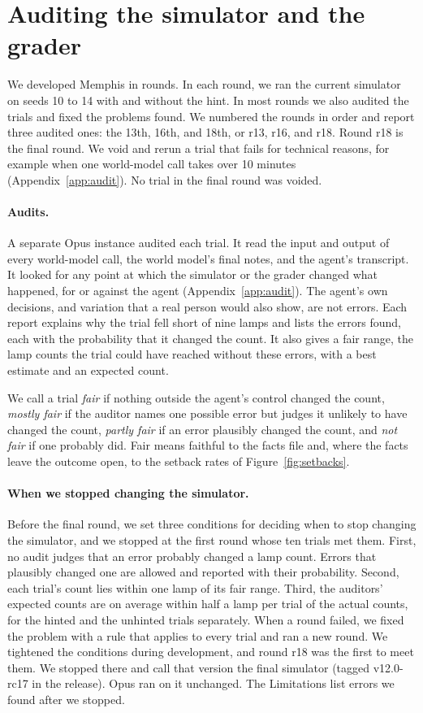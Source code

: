 \documentclass[10pt]{article}
\begin{document}
\section{Auditing the simulator and the grader}
\label{sec:checks}

We developed Memphis in rounds. In each round, we ran the current simulator on seeds 10 to 14 with and without the hint. In most rounds we also audited the trials and fixed the problems found. We numbered the rounds in order and report three audited ones: the 13th, 16th, and 18th, or r13, r16, and r18. Round r18 is the final round. We void and rerun a trial that fails for technical reasons, for example when one world-model call takes over 10 minutes (Appendix~\ref{app:audit}). No trial in the final round was voided.

\paragraph{Audits.} A separate Opus instance audited each trial. It read the input and output of every world-model call, the world model's final notes, and the agent's transcript. It looked for any point at which the simulator or the grader changed what happened, for or against the agent (Appendix~\ref{app:audit}). The agent's own decisions, and variation that a real person would also show, are not errors. Each report explains why the trial fell short of nine lamps and lists the errors found, each with the probability that it changed the count. It also gives a fair range, the lamp counts the trial could have reached without these errors, with a best estimate and an expected count.

We call a trial \emph{fair} if nothing outside the agent's control changed the count, \emph{mostly fair} if the auditor names one possible error but judges it unlikely to have changed the count, \emph{partly fair} if an error plausibly changed the count, and \emph{not fair} if one probably did. Fair means faithful to the facts file and, where the facts leave the outcome open, to the setback rates of Figure~\ref{fig:setbacks}.

\paragraph{When we stopped changing the simulator.} Before the final round, we set three conditions for deciding when to stop changing the simulator, and we stopped at the first round whose ten trials met them. First, no audit judges that an error probably changed a lamp count. Errors that plausibly changed one are allowed and reported with their probability. Second, each trial's count lies within one lamp of its fair range. Third, the auditors' expected counts are on average within half a lamp per trial of the actual counts, for the hinted and the unhinted trials separately. When a round failed, we fixed the problem with a rule that applies to every trial and ran a new round. We tightened the conditions during development, and round r18 was the first to meet them. We stopped there and call that version the final simulator (tagged v12.0-rc17 in the release). Opus ran on it unchanged. The Limitations list errors we found after we stopped.
\end{document}
